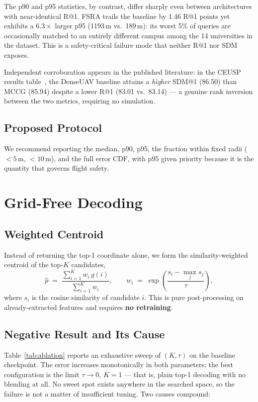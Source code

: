\documentclass[journal]{IEEEtran}
\begin{document}
The p90 and p95 statistics, by contrast, differ sharply even between architectures with
near-identical R@1. FSRA trails the baseline by 1.46 R@1 points yet exhibits a
$6.3\times$ larger p95 (1193\,m vs.\ 189\,m): its worst 5\% of queries are occasionally
matched to an entirely different campus among the 14 universities in the dataset. This is
a safety-critical failure mode that neither R@1 nor SDM exposes.

Independent corroboration appears in the published literature: in the CEUSP results
table~\cite{ceusp}, the DenseUAV baseline attains a \emph{higher} SDM@1 (86.50) than MCCG
(85.94) despite a lower R@1 (83.01 vs.\ 83.14) --- a genuine rank inversion between the
two metrics, requiring no simulation.

\subsection{Proposed Protocol}
We recommend reporting the median, p90, p95, the fraction within fixed radii
($<5$\,m, $<10$\,m), and the full error CDF, with p95 given priority because it is the
quantity that governs flight safety.

\section{Grid-Free Decoding}
\label{sec:decoder}

\subsection{Weighted Centroid}
Instead of returning the top-1 coordinate alone, we form the similarity-weighted centroid
of the top-$K$ candidates,
\begin{equation}
\hat p \;=\; \frac{\sum_{i=1}^{K} w_i\, g(i)}{\sum_{i=1}^{K} w_i},
\qquad
w_i \;=\; \exp\!\left(\frac{s_i - \max_j s_j}{\tau}\right),
\label{eq:centroid}
\end{equation}
where $s_i$ is the cosine similarity of candidate $i$. This is pure post-processing on
already-extracted features and requires \textbf{no retraining}.

\subsection{Negative Result and Its Cause}
Table~\ref{tab:ablation} reports an exhaustive sweep of $(K,\tau)$ on the baseline
checkpoint. The error increases monotonically in both parameters; the best configuration
is the limit $\tau \to 0$, $K = 1$ --- that is, plain top-1 decoding with no blending at
all. No sweet spot exists anywhere in the searched space, so the failure is not a matter
of insufficient tuning. Two causes compound:
\end{document}
